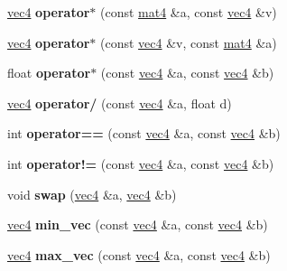 \begin{DoxyCompactItemize}
\item 
\hypertarget{classvec4_a0252c203e5a77099da7fd04c576ed437}{\hyperlink{classvec4}{vec4} {\bfseries operator$\ast$} (const \hyperlink{classmat4}{mat4} \&a, const \hyperlink{classvec4}{vec4} \&v)}\label{classvec4_a0252c203e5a77099da7fd04c576ed437}

\item 
\hypertarget{classvec4_ab8e4f991ed4a9b63e108d9bce7c80a50}{\hyperlink{classvec4}{vec4} {\bfseries operator$\ast$} (const \hyperlink{classvec4}{vec4} \&v, const \hyperlink{classmat4}{mat4} \&a)}\label{classvec4_ab8e4f991ed4a9b63e108d9bce7c80a50}

\item 
\hypertarget{classvec4_adda90795cc9563711997dc2872ed825b}{float {\bfseries operator$\ast$} (const \hyperlink{classvec4}{vec4} \&a, const \hyperlink{classvec4}{vec4} \&b)}\label{classvec4_adda90795cc9563711997dc2872ed825b}

\item 
\hypertarget{classvec4_aab474ed7114f159e8b96a39fb75a77ed}{\hyperlink{classvec4}{vec4} {\bfseries operator/} (const \hyperlink{classvec4}{vec4} \&a, float d)}\label{classvec4_aab474ed7114f159e8b96a39fb75a77ed}

\item 
\hypertarget{classvec4_a341e4e99a5b48405ff8f6507aa604fa5}{int {\bfseries operator==} (const \hyperlink{classvec4}{vec4} \&a, const \hyperlink{classvec4}{vec4} \&b)}\label{classvec4_a341e4e99a5b48405ff8f6507aa604fa5}

\item 
\hypertarget{classvec4_ab31e1953c47b63ec12ee0765afdde4e5}{int {\bfseries operator!=} (const \hyperlink{classvec4}{vec4} \&a, const \hyperlink{classvec4}{vec4} \&b)}\label{classvec4_ab31e1953c47b63ec12ee0765afdde4e5}

\item 
\hypertarget{classvec4_ad7ca462c6964dec321ad4bbb83e1b343}{void {\bfseries swap} (\hyperlink{classvec4}{vec4} \&a, \hyperlink{classvec4}{vec4} \&b)}\label{classvec4_ad7ca462c6964dec321ad4bbb83e1b343}

\item 
\hypertarget{classvec4_acf259b790c1ece6319533affe38a78d0}{\hyperlink{classvec4}{vec4} {\bfseries min\+\_\+vec} (const \hyperlink{classvec4}{vec4} \&a, const \hyperlink{classvec4}{vec4} \&b)}\label{classvec4_acf259b790c1ece6319533affe38a78d0}

\item 
\hypertarget{classvec4_ac9c9289beff2b97eabba84edbe6cae15}{\hyperlink{classvec4}{vec4} {\bfseries max\+\_\+vec} (const \hyperlink{classvec4}{vec4} \&a, const \hyperlink{classvec4}{vec4} \&b)}\label{classvec4_ac9c9289beff2b97eabba84edbe6cae15}


\end{DoxyCompactItemize}
